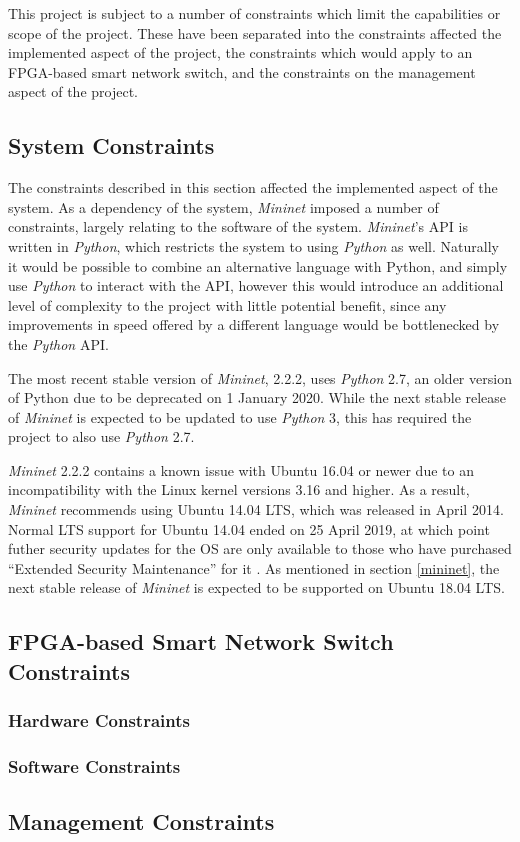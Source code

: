 
This project is subject to a number of constraints which limit the capabilities or scope of the project.
These have been separated into the constraints affected the implemented aspect of the project, the constraints which would apply to an FPGA-based smart network switch, and the constraints on the management aspect of the project.

\subsection{System Constraints}
The constraints described in this section affected the implemented aspect of the system. As a dependency of the system, \textit{Mininet} \cite{mininet} imposed a number of constraints, largely relating to the software of the system. \textit{Mininet}'s API is written in \textit{Python}, which restricts the system to using \textit{Python} as well. Naturally it would be possible to combine an alternative language with Python, and simply use \textit{Python} to interact with the API, however this would introduce an additional level of complexity to the project with little potential benefit, since any improvements in speed offered by a different language would be bottlenecked by the \textit{Python} API.

The most recent stable version of \textit{Mininet}, 2.2.2, uses \textit{Python} 2.7, an older version of Python due to be deprecated on 1 January 2020. While the next stable release of \textit{Mininet} is expected to be updated to use \textit{Python} 3, this has required the project to also use \textit{Python} 2.7.

\textit{Mininet} 2.2.2 contains a known issue with Ubuntu 16.04 or newer due to an incompatibility with the Linux kernel versions 3.16 and higher. As a result, \textit{Mininet} recommends using Ubuntu 14.04 LTS, which was released in April 2014. Normal LTS support for Ubuntu 14.04 ended on 25 April 2019, at which point futher security updates for the OS are only available to those who have purchased ``Extended Security Maintenance'' for it \cite{ubuntu_14_04_release}. As mentioned in section \ref{mininet}, the next stable release of \textit{Mininet} is expected to be supported on Ubuntu 18.04 LTS.

\subsection{FPGA-based Smart Network Switch Constraints}
\subsubsection{Hardware Constraints}
\subsubsection{Software Constraints}

\subsection{Management Constraints}
